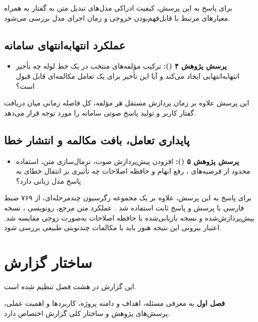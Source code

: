 برای پاسخ به این پرسش، کیفیت ادراکی مدل‌های تبدیل متن به گفتار
به همراه معیارهای مرتبط با قابل‌فهم‌بودن خروجی و زمان اجرای
مدل بررسی می‌شود.


\subsection*{عملکرد انتهابه‌انتهای سامانه}

\begin{itemize}
    \item
    \textbf{پرسش پژوهش ۴ ():}
    ترکیب مؤلفه‌های منتخب در یک خط لوله
    چه تأخیر انتهابه‌انتهایی ایجاد می‌کند و آیا این تأخیر
    برای یک تعامل مکالمه‌ای قابل قبول است؟
\end{itemize}

این پرسش علاوه بر زمان پردازش مستقل هر مؤلفه،
کل فاصله زمانی میان دریافت گفتار کاربر و تولید پاسخ صوتی
سامانه را مورد توجه قرار می‌دهد.


\subsection*{پایداری تعامل، بافت مکالمه و انتشار خطا}

\begin{itemize}
    \item
    \textbf{پرسش پژوهش ۵ ():}
    افزودن پیش‌پردازش صوت، نرمال‌سازی متن، استفاده محدود از
    فرضیه‌های ، رفع ابهام و حافظه اصلاحات چه تأثیری بر
    انتقال خطای  به پاسخ مدل زبانی دارد؟
\end{itemize}

برای پاسخ به این پرسش، علاوه بر یک مجموعه رگرسیون چندمرحله‌ای،
از ۷۶۹ ضبط فارسی  با پرسش و پاسخ ثابت استفاده شد
\cite{conneau2022fleurs}. عملکرد متن مرجع، رونویسی ،
نسخه پیش‌پردازش‌شده و نسخه بازیابی‌شده با حافظه اصلاحات به‌صورت
زوجی مقایسه شد. اعتبار بیرونی این نتیجه هنوز باید با مکالمات
چندنوبتی طبیعی بررسی شود.


\section{ساختار گزارش}

این گزارش در هشت فصل تنظیم شده است.

\textbf{فصل اول} به معرفی مسئله، اهداف و دامنه پروژه،
کاربردها و اهمیت عملی، پرسش‌های پژوهش و ساختار کلی گزارش
اختصاص دارد.

